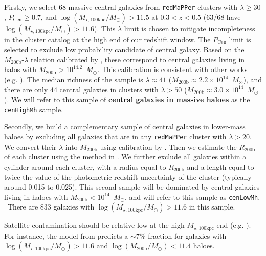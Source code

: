 \documentclass[a4paper,fleqn,usenatbib]{mnras}
\def\msun{$M_\odot$}
\def\redm{\texttt{redMaPPer}}
\def\rbcg{\texttt{cenHighMh}}
\def\nbcg{\texttt{cenLowMh}}
\def\mstar{{$M_{\star}$}}
\def\mhalo{{$M_{\mathrm{200b}}$}}
\def\logmh{{$\log (M_{\mathrm{200b}}/M_{\odot})$}}
\def\mtot{{$M_{\star,100\mathrm{kpc}}$}}
\def\logmtot{{$\log (M_{\star,100\mathrm{kpc}}/M_{\odot})$}}
\newcommand{\alexie}[1]{\textcolor{blue}{\textbf{[Alexie: #1]}}}
\begin{document}
 
    Firstly, we select 68 massive central galaxies from \redm{} clusters 
    with $\lambda \geq 30$, $P_{\mathrm{Cen}} \geq 0.7$, and \logmtot{}$>11.5$ 
    at $0.3 < z < 0.5$ (63/68 have \logmtot{}$>11.6$). 
    This $\lambda$ limit is chosen to mitigate incompleteness in the cluster catalog
    at the high end of our redshift window. 
    The $P_{\mathrm{Cen}}$ limit is selected to exclude low probability candidate of 
    central galaxy. 
    Based on the \mhalo{}-$\lambda$ relation calibrated by \citet{Simet2016}, these 
    correspond to central galaxies living in halos with \mhalo{}$>10^{14.2}$~\msun{}. 
    This calibration is consistent with other works (e.g. \citealt{Saro2015, Farahi2016, 
    Melchior2016, Murata2017}). 
    The median richness of the sample is $\lambda \approx 41$ 
    (\mhalo{}$\approx 2.2 \times 10^{14}$~\msun{}), and there are 
    only 44 central galaxies in clusters with $\lambda>50$ 
    (\mhalo{}$\approx 3.0 \times 10^{14}$~\msun{}).
    We will refer to this sample of \textbf{central galaxies in massive haloes} as 
    the \rbcg{} sample.
    
    Secondly, we build a complementary sample of central galaxies in lower-mass haloes
    by excluding all galaxies that are in any \redm{} cluster with $\lambda > 20$.
    We convert their $\lambda$ into $M_{\mathrm{200b}}$ using calibration by 
    \citet{Simet2016}. 
    Then we estimate the $R_{\mathrm{200b}}$ of each cluster using the method in 
    \citet{Diemer2015}. 
    We further exclude all galaxies within a cylinder around each cluster, with a radius
    equal to $R_{\mathrm{200b}}$ and a length equal to twice the value of the 
    photometric redshift uncertainty of the cluster (typically around 0.015 to 0.025).
    This second sample will be dominated by central galaxies living in haloes with
    $M_{\mathrm{200b}} < 10^{14}$~\msun{}, and will refer to this sample as \nbcg{}. \
    There are 833 galaxies with \logmtot{}$> 11.6$ in this sample.


    Satellite contamination should be relative low at the high-\mtot{} end
    (e.g. \citealt{Reid2014, Hoshino2015, Saito2016, vanUitert2016}). 
    For instance, the model from \citet{Saito2016} predicts a $\sim 7$\% 
    fraction for galaxies with \logmtot{}$>11.6$ and \logmh$<11.4$ haloes.
    
\end{document}
